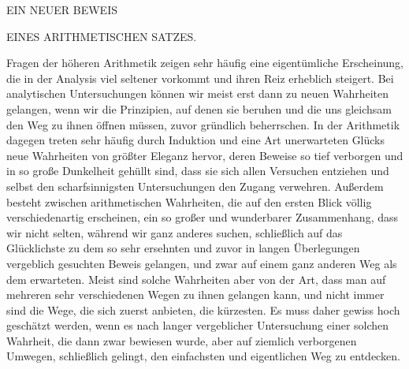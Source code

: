\begin{center}\Large EIN NEUER BEWEIS\end{center}

\begin{center}\large EINES ARITHMETISCHEN SATZES.\end{center}

\BookRule{35mm}


Fragen der höheren Arithmetik zeigen sehr häufig eine eigentümliche Erscheinung, die in der Analysis viel seltener vorkommt und ihren Reiz erheblich steigert. Bei analytischen Untersuchungen können wir meist erst dann zu neuen Wahrheiten gelangen, wenn wir die Prinzipien, auf denen sie beruhen und die uns gleichsam den Weg zu ihnen öffnen müssen, zuvor gründlich beherrschen. In der Arithmetik dagegen treten sehr häufig durch Induktion und eine Art unerwarteten Glücks neue Wahrheiten von größter Eleganz hervor, deren Beweise so tief verborgen und in so große Dunkelheit gehüllt sind, dass sie sich allen Versuchen entziehen und selbst den scharfsinnigsten Untersuchungen den Zugang verwehren. Außerdem besteht zwischen arithmetischen Wahrheiten, die auf den ersten Blick völlig verschiedenartig erscheinen, ein so großer und wunderbarer Zusammenhang, dass wir nicht selten, während wir ganz anderes suchen, schließlich auf das Glücklichste zu dem so sehr ersehnten und zuvor in langen Überlegungen vergeblich gesuchten Beweis gelangen, und zwar auf einem ganz anderen Weg als dem erwarteten. Meist sind solche Wahrheiten aber von der Art, dass man auf mehreren sehr verschiedenen Wegen zu ihnen gelangen kann, und nicht immer sind die Wege, die sich zuerst anbieten, die kürzesten. Es muss daher gewiss hoch geschätzt werden, wenn es nach langer vergeblicher Untersuchung einer solchen Wahrheit, die dann zwar bewiesen wurde, aber auf ziemlich verborgenen Umwegen, schließlich gelingt, den einfachsten und eigentlichen Weg zu entdecken.


